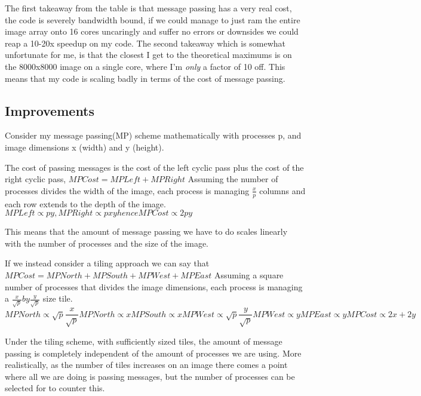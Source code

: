 \documentclass[10pt]{article}
\begin{document}
    The first takeaway from the table is that message passing has a very real cost, the code is severely bandwidth bound,
    if we could manage to just ram the entire image array onto 16 cores uncaringly and suffer no errors or downsides we could reap a 10-20x speedup on my code.
    The second takeaway which is somewhat unfortunate for me, is that the closest I get to the theoretical maximums is on the 8000x8000 image on a single core, where
    I'm \textit{only} a factor of 10 off. This means that my code is scaling badly in terms of the cost of message passing.

    \subsection{Improvements}
    Consider my message passing(MP) scheme mathematically with processes p, and image dimensions x (width) and y (height).

    The cost of passing messages is the cost of the left cyclic pass plus the cost of the right cyclic pass, $MP Cost = MP Left + MP Right$
    Assuming the number of processes divides the width of the image, each process is managing $\frac{x}{p}$ columns and each row extends to
    the depth of the image.
    $MP Left \propto py , MP Right \propto pxy hence MP Cost \propto 2py$

    This means that the amount of message passing we have to do scales linearly with the number of processes and the size of the image.

    If we instead consider a tiling approach we can say that $MP Cost = MP North + MP South + MP West + MP East$
    Assuming a square number of processes that divides the image dimensions, each process is managing a $\frac{x}{\sqrt{p}} by \frac{y}{\sqrt{p}}$ size tile.
    $$ MP North \propto \sqrt{p}\frac{x}{\sqrt{p}}
    MP North \propto x
    MP South \propto x
    MP West \propto \sqrt{p}\frac{y}{\sqrt{p}}
    MP West \propto y
    MP East \propto y

    MP Cost \propto 2x+2y$$

    Under the tiling scheme, with sufficiently sized tiles, the amount of message passing is completely independent of the amount of processes we are using.
    More realistically, as the number of tiles increases on an image there comes a point where all we are doing is passing messages, but the number of processes
    can be selected for to counter this.












  
\end{document}
